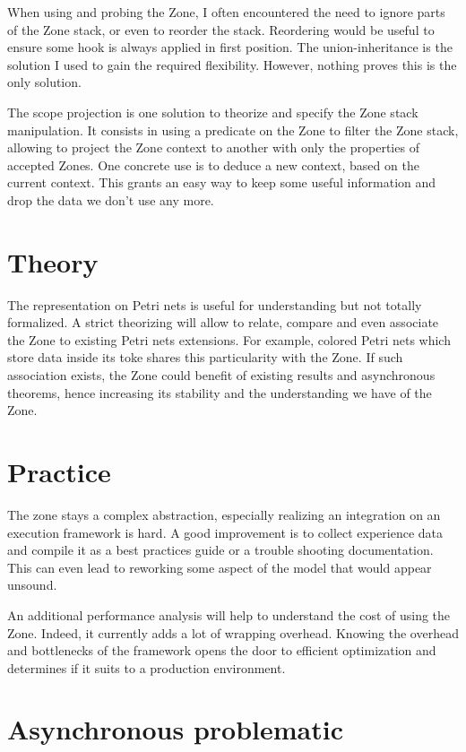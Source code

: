 When using and probing the Zone, I often encountered the need to ignore parts of the Zone stack, or even to reorder the stack. Reordering would be useful to ensure some hook is always applied in first position. The union-inheritance is the solution I used to gain the required flexibility. However, nothing proves this is the only solution. 

The scope projection is one solution to theorize and specify the Zone stack manipulation. It consists in using a predicate on the Zone to filter the Zone stack, allowing to project the Zone context to another with only the properties of accepted Zones. One concrete use is to deduce a new context, based on the current context. This grants an easy way to keep some useful information and drop the data we don't use any more.

\section{Theory}

The representation on Petri nets is useful for understanding but not totally formalized. A strict theorizing will allow to relate, compare and even associate the Zone to existing Petri nets extensions. For example, colored Petri nets which store data inside its toke shares this particularity with the Zone. If such association exists, the Zone could benefit of existing results and asynchronous theorems, hence increasing its stability and the understanding we have of the Zone.

\section{Practice}

The zone stays a complex abstraction, especially realizing an integration on an execution framework is hard. A good improvement is to collect experience data and compile it as a best practices guide or a trouble shooting documentation. This can even lead to reworking some aspect of the model that would appear unsound.

An additional performance analysis will help to understand the cost of using the Zone. Indeed, it currently adds a lot of wrapping overhead. Knowing the overhead and bottlenecks of the framework opens the door to efficient optimization and determines if it suits to a production environment.



\section{Asynchronous problematic}

